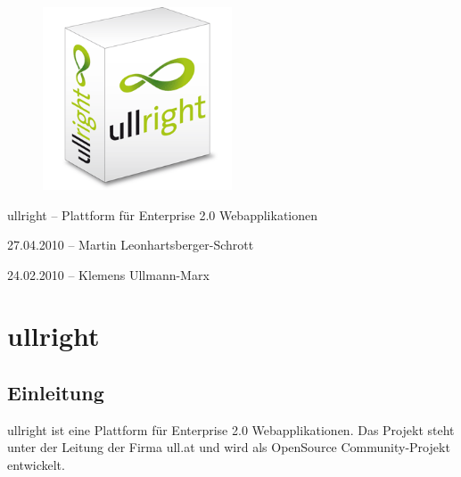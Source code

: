 \documentclass[article, a4paper, oneside, 11pt]{memoir}
\begin{document}
\vspace*{3cm}
\begin{figure}[htp]
\centering
\includegraphics[width=0.5\textwidth]{softwarebox}
\end{figure}

\vspace{3cm}

{%
\LARGE
\color{ullblue}
ullright -- Plattform für Enterprise 2.0 Webapplikationen
}

\vspace{0.2cm}

{%
\large
}

\vspace{1cm}

{%
\footnotesize
27.04.2010 -- Martin Leonhartsberger-Schrott

24.02.2010 -- Klemens Ullmann-Marx
}

\clearpage

\pagestyle{plain}


\setcounter{secnumdepth}{2}
\setcounter{tocdepth}{2}
\tableofcontents*

\clearpage

\addtocounter{chapter}{1}

\chapter*{ullright}

\section{Einleitung}
ullright ist eine Plattform für Enterprise 2.0 Webapplikationen. Das Projekt steht unter der Leitung der Firma ull.at und wird als OpenSource Community-Projekt entwickelt.
\end{document}
